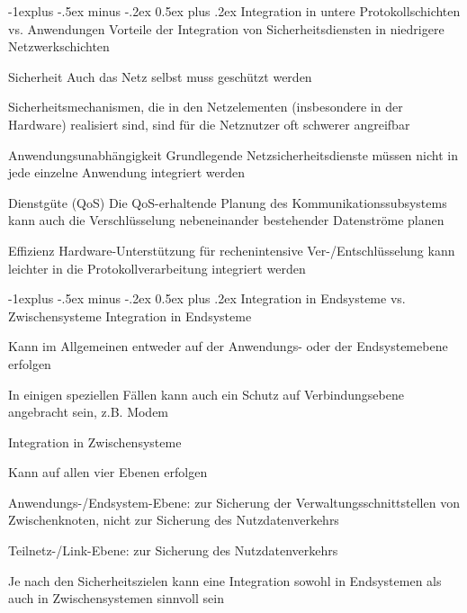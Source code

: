 \documentclass[a4paper]{article}
\makeatletter
\renewcommand{\subsection}{\@startsection{subsection}{2}{0mm}%
 {-1explus -.5ex minus -.2ex}%
 {0.5ex plus .2ex}%
 {\normalfont\normalsize\bfseries}}
\makeatother
\begin{document}
\begin{multicols}{3}
      \subsection{Integration in untere Protokollschichten vs. Anwendungen}
      Vorteile der Integration von Sicherheitsdiensten in niedrigere Netzwerkschichten
      \begin{description*}
            \item[Sicherheit] Auch das Netz selbst muss geschützt werden
            \item[] Sicherheitsmechanismen, die in den Netzelementen (insbesondere in der Hardware) realisiert sind, sind für die Netznutzer oft schwerer angreifbar
            \item[Anwendungsunabhängigkeit] Grundlegende Netzsicherheitsdienste müssen nicht in jede einzelne Anwendung integriert werden
            \item[Dienstgüte (QoS)] Die QoS-erhaltende Planung des Kommunikationssubsystems kann auch die Verschlüsselung nebeneinander bestehender Datenströme planen
            \item[Effizienz] Hardware-Unterstützung für rechenintensive Ver-/Entschlüsselung kann leichter in die Protokollverarbeitung integriert werden
      \end{description*}

      \subsection{Integration in Endsysteme vs. Zwischensysteme}
      Integration in Endsysteme
      \begin{itemize*}
            \item Kann im Allgemeinen entweder auf der Anwendungs- oder der Endsystemebene erfolgen
            \item In einigen speziellen Fällen kann auch ein Schutz auf Verbindungsebene angebracht sein, z.B. Modem %
      \end{itemize*}
      Integration in Zwischensysteme
      \begin{itemize*}
            \item Kann auf allen vier Ebenen erfolgen
            \item Anwendungs-/Endsystem-Ebene: zur Sicherung der Verwaltungsschnittstellen von Zwischenknoten, nicht zur Sicherung des Nutzdatenverkehrs
            \item Teilnetz-/Link-Ebene: zur Sicherung des Nutzdatenverkehrs
      \end{itemize*}
      Je nach den Sicherheitszielen kann eine Integration sowohl in Endsystemen als auch in Zwischensystemen sinnvoll sein


\end{multicols}
\end{document}
